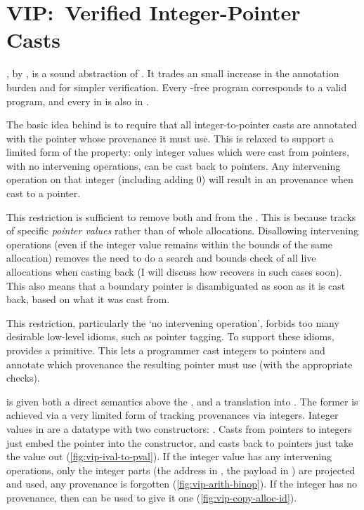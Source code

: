 \section{VIP:\ Verified Integer-Pointer Casts}

, by , is a sound abstraction of
. It trades an small increase in the annotation burden and
 for simpler verification. Every -free  program
corresponds to a valid  program, and every  in
 is also  in .

The basic idea behind  is to require that all integer-to-pointer casts
are annotated with the pointer whose provenance it must use. This is relaxed to
support a limited form of the  property: only integer values
which were cast from pointers, with no intervening operations, can be
 cast back to pointers. Any intervening operation on that
integer (including adding 0) will result in an  provenance
when cast to a pointer.

This restriction is sufficient to remove both  and
 from the . This is
because  tracks  of specific \emph{pointer values} rather than
of whole allocations. Disallowing intervening operations (even if the integer
value remains within the bounds of the same allocation) removes the need to do
a search and bounds check of all live allocations when casting back (I will
discuss how  recovers  in such cases soon). This also
means that a boundary pointer is disambiguated as soon as it is cast back,
based on what it was cast from.

This restriction, particularly the `no intervening operation', forbids too
many desirable low-level idioms, such as pointer tagging. To
support these idioms,  provides a
primitive. This lets a programmer cast integers to pointers and annotate which
provenance the resulting pointer must use (with the appropriate checks).

 is given both a direct semantics above the
, and a translation into .
The former is achieved via a very limited form of tracking
provenances via integers. Integer values in  are a
datatype with two constructors: . Casts from pointers  to integers just embed the pointer
into the  constructor, and casts back to pointers just take the
value out (\cref{fig:vip-ival-to-pval}). If the integer value has any
intervening operations, only the integer parts (the address  in
, the payload  in ) are projected and used, any
provenance is forgotten (\cref{fig:vip-arith-binop}). If the integer has no
provenance, then  can be used to give it one
(\cref{fig:vip-copy-alloc-id}).

